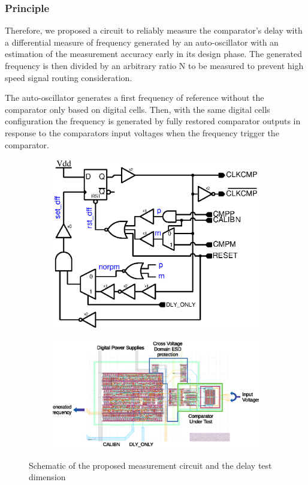\subsubsection{Principle}
Therefore, we proposed a circuit to reliably measure the comparator's delay with a differential measure of frequency generated by an auto-oscillator with an estimation of the measurement accuracy early in its design phase. The generated frequency is then divided by an arbitrary ratio N to be measured to prevent high speed signal routing consideration.

The auto-oscillator generates a first frequency of reference without the comparator only based on digital cells. Then, with the same digital cells configuration the frequency is generated by fully restored comparator outputs in response to the comparators input voltages when the frequency trigger the comparator.

\begin{figure}[htp]
    \centering
    \begin{subfigure}[b]{0.47\linewidth}
	    \includegraphics[width=\textwidth]{Chapter5/Figs/test_delay_comp_new_simp.ps}
    \end{subfigure}
    \begin{subfigure}[b]{0.50\linewidth}
	    \includegraphics[width=\textwidth]{Chapter5/Figs/layout_delay_meas.eps}
    \end{subfigure}
    \caption{Schematic of the proposed measurement circuit and the delay test dimension}
	\label{fig:meas_circ_schem}
\end{figure}

